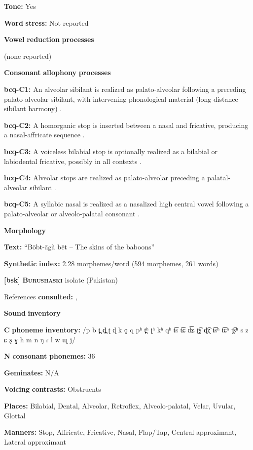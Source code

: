 \textbf{Tone:} Yes

\textbf{Word} \textbf{stress:} Not reported

\textbf{Vowel} \textbf{reduction} \textbf{processes}

(none reported)

\textbf{Consonant} \textbf{allophony} \textbf{processes}

\textbf{bcq-C1:} An alveolar sibilant is realized as palato-alveolar following a preceding palato-alveolar sibilant, with intervening phonological material (long distance sibilant harmony) \citep[67]{Rapold2006}.

\textbf{bcq-C2:} A homorganic stop is inserted between a nasal and fricative, producing a nasal-affricate sequence \citep[69]{Rapold2006}.

\textbf{bcq-C3:} A voiceless bilabial stop is optionally realized as a bilabial or labiodental fricative, possibly in all contexts \citep[73]{Rapold2006}.

\textbf{bcq-C4:} Alveolar stops are realized as palato-alveolar preceding a palatal-alveolar sibilant \citep[74]{Rapold2006}.

\textbf{bcq-C5:} A syllabic nasal is realized as a nasalized high central vowel following a palato-alveolar or alveolo-palatal consonant \citep[76]{Rapold2006}.

\textbf{Morphology}

\textbf{Text:} “Bōbt-āgà bēt -- The skins of the baboons” \citep[594-599]{Rapold2006}

\textbf{Synthetic} \textbf{index:} 2.28 morphemes/word (594 morphemes, 261 words)

\textbf{[bsk]}   \textbf{\textsc{Burushaski}}  isolate (Pakistan)

References \textbf{consulted:} \citet{Anderson1997}, \citet{Yoshioka2012}

\textbf{Sound} \textbf{inventory}

\textbf{C} \textbf{phoneme} \textbf{inventory:} /p b t̪ d̪ ʈ ɖ k ɡ q pʰ t̪ʰ ʈʰ kʰ qʰ t͡s t͡ɕ d͡ʑ ʈ͡ʂ ɖ͡ʐ t͡sʰ t͡ɕʰ ʈ͡ʂʰ s z ɕ ʂ ɣ h m n ŋ ɾ l w ɰ̟ j/

\textbf{N} \textbf{consonant} \textbf{phonemes:} 36

\textbf{Geminates:} N/A

\textbf{Voicing} \textbf{contrasts:} Obstruents

\textbf{Places:} Bilabial, Dental, Alveolar, Retroflex, Alveolo-palatal, Velar, Uvular, Glottal

\textbf{Manners:} Stop, Affricate, Fricative, Nasal, Flap/Tap, Central approximant, Lateral approximant

